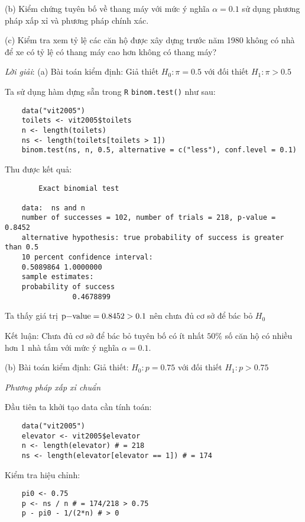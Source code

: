 (b) Kiểm chứng tuyên bố về thang máy với mức ý nghĩa $\alpha = 0.1$ sử dụng phương pháp xấp xỉ
và phương pháp chính xác.

(c) Kiểm tra xem tỷ lệ các căn hộ được xây dựng trước năm 1980 không có nhà để xe có
tỷ lệ có thang máy cao hơn không có thang máy?

\textit{Lời giải}:
(a) 
Bài toán kiểm định: Giả thiết $H_0: \pi = 0.5$ với đối thiết $H_1: \pi > 0.5$

Ta sử dụng hàm dựng sẵn trong \lstinline{R} \lstinline{binom.test()} như sau:

\begin{lstlisting}
    data("vit2005")
    toilets <- vit2005$toilets
    n <- length(toilets)
    ns <- length(toilets[toilets > 1])
    binom.test(ns, n, 0.5, alternative = c("less"), conf.level = 0.1)
\end{lstlisting}

Thu được kết quả:

\begin{lstlisting}
        Exact binomial test

    data:  ns and n
    number of successes = 102, number of trials = 218, p-value = 0.8452
    alternative hypothesis: true probability of success is greater than 0.5
    10 percent confidence interval:
    0.5089864 1.0000000
    sample estimates:
    probability of success 
                0.4678899 
\end{lstlisting}
Ta thấy giá trị $\text{\lstinline{p-value}} = 0.8452 > 0.1$ nên chưa đủ cơ sở để bác bỏ $H_0$

Kết luận: Chưa đủ cơ sở để bác bỏ tuyên bố có ít nhất $50\%$ số căn hộ có nhiều hơn 1 nhà tắm
với mức ý nghĩa $\alpha = 0.1$.

(b) 
Bài toán kiểm định: Giả thiết: $H_0: p = 0.75$ với đối thiết $H_1: p > 0.75$

\textit{Phương pháp xấp xỉ chuẩn}

Đầu tiên ta khởi tạo data cần tính toán:

\begin{lstlisting}
    data("vit2005")
    elevator <- vit2005$elevator
    n <- length(elevator) # = 218
    ns <- length(elevator[elevator == 1]) # = 174
\end{lstlisting}

Kiểm tra hiệu chỉnh:

\begin{lstlisting}
    pi0 <- 0.75
    p <- ns / n # = 174/218 > 0.75
    p - pi0 - 1/(2*n) # > 0
\end{lstlisting}

